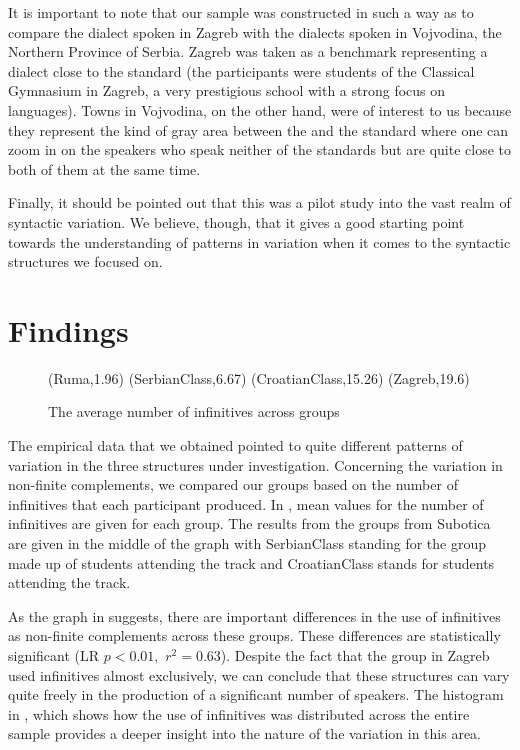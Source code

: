 \documentclass[output=paper,modfonts,newtxmath,hidelinks,]{langscibook}
\begin{document}
It is important to note that our sample was constructed in such a way as to compare the dialect spoken in Zagreb with the dialects spoken in Vojvodina, the Northern Province of Serbia. Zagreb was taken as a benchmark representing a dialect close to the  standard (the participants were students of the Classical Gymnasium in Zagreb, a very prestigious school with a strong focus on languages). Towns in Vojvodina, on the other hand, were of interest to us because they represent the kind of gray area between the  and the  standard where one can zoom in on the speakers who speak neither of the standards but are quite close to both of them at the same time.

Finally, it should be pointed out that this was a pilot study into the vast realm of syntactic variation. We believe, though, that it gives a good starting point towards the understanding of patterns in variation when it comes to the syntactic structures we focused on.\largerpage

\section{Findings}\label{7:s3}

\begin{figure}[b]
\footnotesize
\textsf{ 
%
{
(Ruma,1.96)
(SerbianClass,6.67)
(CroatianClass,15.26)
(Zagreb,19.6)
}}
\caption{The average number of infinitives across groups}\label{7:fig:key:1}
\end{figure}


The empirical data that we obtained pointed to quite different patterns of variation in the three structures under investigation. Concerning the variation in non-finite complements, we compared our groups based on the number of infinitives that each participant produced. In , mean values for the number of infinitives are given for each group. The results from the groups from Subotica are given in the middle of the graph with \textsf{SerbianClass} standing for the group made up of students attending the  track and 
\textsf{CroatianClass} stands for students attending the  track.

  
As the graph in  suggests, there are important differences in the use of infinitives as non-finite complements across these groups. These differences are statistically significant (LR $p<0.01,$ $r^2 = 0.63$). Despite the fact that the group in Zagreb used infinitives almost exclusively, we can conclude that these structures can vary quite freely in the production of a significant number of speakers. The histogram in , which shows how the use of infinitives was distributed across the entire sample provides a deeper insight into the nature of the variation in this area.
\end{document}
